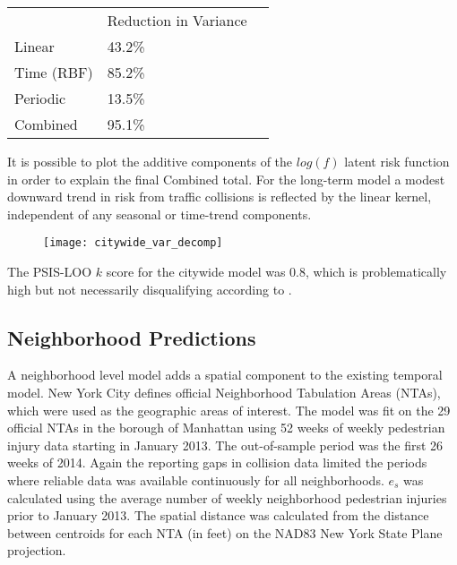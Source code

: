 \begin{table}[]
\centering
\label{variance_citywide}
\begin{tabular}{@{}lll@{}}
           & Reduction in Variance &  \\
Linear     & 43.2\%                &  \\
Time (RBF) & 85.2\%                &  \\
Periodic   & 13.5\%                &  \\
Combined   & 95.1\%                &
\end{tabular}
\end{table}

It is possible to plot the additive components of the $log(f)$ latent risk function in order to explain the final Combined total. For the long-term model a modest downward trend in risk from traffic collisions is reflected by the linear kernel, independent of any seasonal or time-trend components. \par

\begin{figure}[h!]
  \centering
  \caption{}
  \texttt{[image: citywide\_var\_decomp]}
\end{figure}

The PSIS-LOO $k$ score for the citywide model was 0.8, which is problematically high but not necessarily disqualifying according to \cite{vehtari_loo}.

 \subsection{Neighborhood Predictions}

 A neighborhood level model adds a spatial component to the existing temporal model.  New York City defines official Neighborhood Tabulation Areas (NTAs), which were used as the geographic areas of interest. The model was fit on the 29 official NTAs in the borough of Manhattan using 52 weeks of weekly pedestrian injury data starting in January 2013. The out-of-sample period was the first 26 weeks of 2014. Again the reporting gaps in collision data limited the periods where reliable data was available continuously for all neighborhoods. $e_s$ was calculated using the average number of weekly neighborhood pedestrian injuries prior to January 2013.  The spatial distance was calculated from the distance between centroids for each NTA (in feet) on the NAD83 New York State Plane projection. \par

